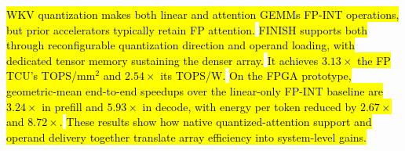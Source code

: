 \documentclass[sigconf,anonymous,nonacm]{acmart}
\newcommand{\ours}{\textsc{FINISH}}
\newcommand{\fpint}{FP-INT}
\DeclareRobustCommand{\rev}[1]{\hl{#1}}
\begin{document}
\rev{WKV quantization makes both linear and attention GEMMs \fpint{} operations, but prior accelerators typically retain FP attention.} \rev{\ours{} supports both through reconfigurable quantization direction and operand loading, with dedicated tensor memory sustaining the denser array.} \rev{It achieves $3.13\times$ the FP TCU's TOPS/mm$^2$ and $2.54\times$ its TOPS/W.} \rev{On the FPGA prototype, geometric-mean end-to-end speedups over the linear-only \fpint{} baseline are $3.24\times$ in prefill and $5.93\times$ in decode, with energy per token reduced by $2.67\times$ and $8.72\times$.} \rev{These results show how native quantized-attention support and operand delivery together translate array efficiency into system-level gains.}







\end{document}
